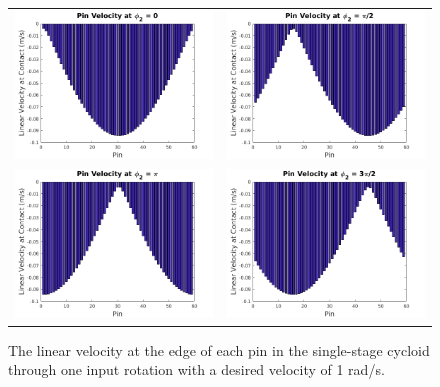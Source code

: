 \begin{figure}[h]
   \centering
   \begin{tabular}{cc}
	   \includegraphics[width=0.48\linewidth]{fig/single_vel_0pi} &
	   \includegraphics[width=0.48\linewidth]{fig/single_vel_pi_2} \\
	   \includegraphics[width=0.48\linewidth]{fig/single_vel_pi} &
	   \includegraphics[width=0.48\linewidth]{fig/single_vel_3pi2}
   \end{tabular}
   \caption{The linear velocity at the edge of each pin in the single-stage cycloid through one input rotation with a desired velocity of 1 rad/s.}
   \label{fig:single_sliding}
\end{figure}

